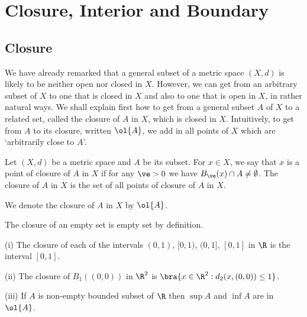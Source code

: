 \section{Closure, Interior and Boundary}

\subsection{Closure}

We have already remarked that a general subset of a metric space $(X,d)$ is likely to be neither open nor closed in $X$. However, we can get from an arbitrary subset of $X$ to one that is closed in
$X$ and also to one that is open in $X$, in rather natural ways. We shall explain first how to get from a general subset $A$ of $X$ to a related set, called the closure of $A$ in $X$, which is
closed in $X$. Intuitively, to get from $A$ to its closure, written $\ol{A}$, we add in all points of $X$ which are `arbitrarily close to $A$'.

\begin{definition}\label{def:closure_metric_space}
Let $(X,d)$ be a metric space and $A$ be its subset. For $x\in X$, we say that $x$ is a point of closure of $A$ in $X$ if for any $\ve >0$ we have $B_\ve(x)\cap A\neq \emptyset$. The closure of $A$
in $X$ is the set of all points of closure of $A$ in $X$.

We denote the closure of $A$ in $X$ by $\ol{A}$.
\end{definition}

\begin{remark}
The closure of an empty set is empty set by definition.
\end{remark}



\begin{example}
\ben
\item [(i)] The closure of each of the intervals $(0,1)$, $[0,1)$, $(0,1]$, $[0,1]$ in $\R$ is the interval $[0,1]$.
\item [(ii)] The closure of $B_1((0,0))$ in $\R^2$ is $\bra{x\in \R^2:d_2(x,(0,0)) \leq 1}$.
\item [(iii)] If $A$ is non-empty bounded subset of $\R$ then $\sup A$ and $\inf A$ are in $\ol{A}$.
\een
\end{example}



